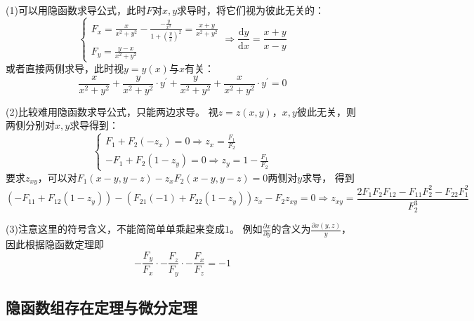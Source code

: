 \begin{solution}
  (1)可以用隐函数求导公式，此时$F$对$x,y$求导时，将它们视为彼此无关的：
  \begin{equation*}
    \begin{cases}
      F_x = \frac{x}{x^2 + y^2} - \frac{-\frac{y}{x^2}}{1 + \left( \frac{y}{x} \right)^2} = \frac{x+y}{x^2 + y^2}\\
      F_y = \frac{y-x}{x^2 + y^2}
    \end{cases} \Rightarrow \frac{\mathrm{d} y}{\mathrm{d} x} = \frac{x+y}{x-y}
  \end{equation*}
  或者直接两侧求导，此时视$y = y(x)$与$x$有关：
  \begin{equation*}
    \frac{x}{x^2 + y^2} + \frac{y}{x^2 + y^2}\cdot y^{\prime} + \frac{y}{x^2 + y^2} + \frac{x}{x^2 + y^2}\cdot y^{\prime} = 0
  \end{equation*}

  (2)比较难用隐函数求导公式，只能两边求导。
  视$z = z(x,y)$，$x,y$彼此无关，则
  两侧分别对$x,y$求导得到：
  \begin{equation*}
    \begin{cases}
      F_1 + F_2(- z_x) = 0 \Rightarrow z_x = \frac{F_1}{F_2}\\
      -F_1 + F_2(1 - z_y) = 0 \Rightarrow z_y =1 - \frac{F_1}{F_2}
    \end{cases}
  \end{equation*}
  要求$z_{xy}$，可以对$F_1(x-y,y-z)- z_x F_2(x-y,y-z) = 0$两侧对$y$求导，
  得到
  \begin{equation*}
    \left( - F_{11} + F_{12}(1 - z_y) \right) - \left( F_{21}(-1) + F_{22}(1 - z_y) \right)z_x - F_2 z_{xy} = 0 \Rightarrow z_{xy} = \frac{2F_1F_2F_{12} - F_{11}F_2^2 - F_{22}F_1^2}{F_2^3}
  \end{equation*}

  (3)注意这里的符号含义，不能简简单单乘起来变成$1$。
  例如$\frac{\partial x}{\partial y}$的含义为$\frac{\partial x(y,z)}{y}$，
  因此根据隐函数定理即
  \begin{equation*}
    -\frac{F_y}{F_x} \cdot - \frac{F_z}{F_y} \cdot - \frac{F_x}{F_z} = -1
  \end{equation*}
\end{solution}



\subsection{隐函数组存在定理与微分定理}

